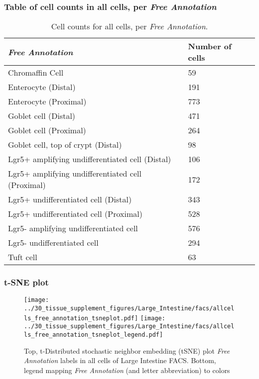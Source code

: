 \subsubsection{Table of cell counts in all cells, per \emph{Free Annotation}}\begin{table}[h]
\centering
\label{my-label}
\begin{tabular}{@{}ll@{}}
\toprule

\emph{Free Annotation}& Number of cells \\ \midrule
Chromaffin Cell & 59 \\

Enterocyte (Distal) & 191 \\

Enterocyte (Proximal) & 773 \\

Goblet cell (Distal) & 471 \\

Goblet cell (Proximal) & 264 \\

Goblet cell, top of crypt (Distal) & 98 \\

Lgr5+ amplifying undifferentiated cell (Distal) & 106 \\

Lgr5+ amplifying undifferentiated cell (Proximal) & 172 \\

Lgr5+ undifferentiated cell (Distal) & 343 \\

Lgr5+ undifferentiated cell (Proximal) & 528 \\

Lgr5- amplifying undifferentiated cell & 576 \\

Lgr5- undifferentiated cell & 294 \\

Tuft cell & 63 \\
\bottomrule
\end{tabular}
\caption{Cell counts for all cells, per \emph{Free Annotation}.}
\end{table}

\clearpage
\subsubsection{t-SNE plot}
\begin{figure}[h]
\centering
\texttt{[image: ../30\_tissue\_supplement\_figures/Large\_Intestine/facs/allcells\_free\_annotation\_tsneplot.pdf]}
\texttt{[image: ../30\_tissue\_supplement\_figures/Large\_Intestine/facs/allcells\_free\_annotation\_tsneplot\_legend.pdf]}
\caption{Top, t-Distributed stochastic neighbor embedding (tSNE) plot  \emph{Free Annotation} labels in all cells of Large Intestine FACS. Bottom, legend mapping \emph{Free Annotation} (and letter abbreviation) to colors}
\end{figure}


